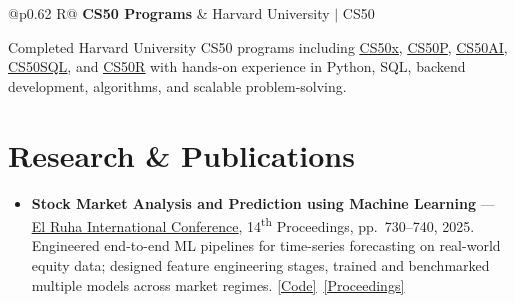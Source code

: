 \documentclass[a4paper,10pt]{article}
\newcommand{\ulink}[2]{\href{#1}{\uline{#2}}}
\newcommand{\subheading}[1]{{\color[HTML]{0A0A0A}\fontsize{12}{14}\selectfont\bfseries #1}}
\newcommand{\meta}[1]{{\color[HTML]{5C5C5C}\fontsize{10.5}{12.5}\selectfont #1}}
\begin{document}
\begin{tabularx}{\linewidth}{@{}p{0.62\linewidth} R@{}}
  \subheading{CS50 Programs} &
  \meta{Harvard University $|$ CS50}
\end{tabularx}
\vspace{2pt}
{\color[HTML]{3A3A3A}\fontsize{11}{14}\selectfont Completed Harvard University CS50 programs including \ulink{https://cs50.harvard.edu/certificates/b14b78df-e05c-413e-a607-1dd27303053a}{CS50x}, \ulink{https://cs50.harvard.edu/certificates/32477052-9db4-49c4-a5a4-d7e58429ca2c}{CS50P}, \ulink{https://cs50.harvard.edu/certificates/9cdb4d4a-1250-4f8e-9fd7-191864e0f919}{CS50AI}, \ulink{https://cs50.harvard.edu/certificates/bc486f24-f085-4e61-8536-80940b97a1b9}{CS50SQL}, and \ulink{https://cs50.harvard.edu/certificates/666838e6-a053-4d82-b179-a60fe745fd84}{CS50R} with hands-on experience in Python, SQL, backend development, algorithms, and scalable problem-solving.}
\section{Research \& Publications}
\vspace{2pt}

\begin{itemize}[nosep, leftmargin=1.5em, itemsep=1pt, topsep=1pt]
  \item {\color[HTML]{0A0A0A}\fontsize{11}{14}\selectfont
    \textbf{Stock Market Analysis and Prediction using Machine Learning} ---
    \ulink{https://www.elruha.org/_files/ugd/614b1f_6b95e1b697bf452b9907ba46e0151c05.pdf\#page=774}{El Ruha International Conference}, 14\textsuperscript{th} Proceedings, pp.\ 730--740, 2025.
    Engineered end-to-end ML pipelines for time-series forecasting on real-world equity data; designed feature engineering stages, trained and benchmarked multiple models across market regimes.
    \ulink{https://github.com/su-jin1425/Set-Project}{[Code]}\ \ulink{https://www.elruha.org/congress-books}{[Proceedings]}
  }
\end{itemize}

\vspace{2pt}

\end{document}
